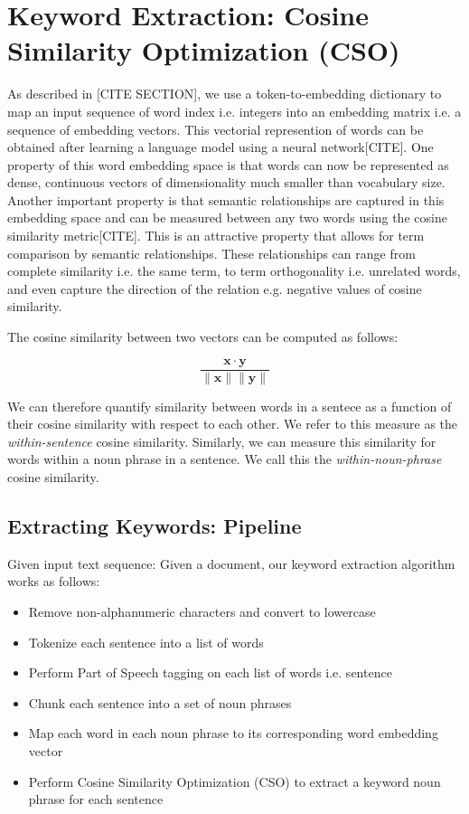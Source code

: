 \section{Keyword Extraction: Cosine Similarity Optimization (CSO)}
As described in [CITE SECTION], we use a token-to-embedding dictionary to map an
input sequence of word index i.e. integers into an embedding matrix i.e. a sequence of
embedding vectors.
This vectorial represention of words can be obtained after learning a language model
using a neural network[CITE]. One property of this word embedding space is that words
can now be represented as dense, continuous vectors of dimensionality much smaller than
vocabulary size. Another important property is that semantic relationships are captured
in this embedding space and can be measured between any two words using the cosine
similarity metric[CITE]. This is an attractive property that allows for term comparison
by semantic relationships. These relationships can range from complete similarity i.e. the
same term, to term orthogonality i.e. unrelated words, and even capture the direction of
the relation e.g. negative values of cosine similarity.

The cosine similarity between two vectors can be computed as follows:

\[
  \frac{\mathbf{x} \cdot \mathbf{y}}{\lVert \mathbf{x} \rVert \lVert \mathbf{y} \rVert}
\]

We can therefore quantify similarity between words in a sentece as a function of their
cosine similarity with respect to each other. We refer to this measure as the \textit{within-sentence}
cosine similarity. Similarly, we can measure this similarity for words within a noun phrase
in a sentence. We call this the \textit{within-noun-phrase} cosine similarity.

\subsection{Extracting Keywords: Pipeline}
Given input text sequence: Given a document, our keyword extraction algorithm works as
follows:
\begin{itemize}
  \item{Remove non-alphanumeric characters and convert to lowercase}
  \item{Tokenize each sentence into a list of words}
  \item{Perform Part of Speech tagging on each list of words i.e. sentence}
  \item{Chunk each sentence into a set of noun phrases}
  \item{Map each word in each noun phrase to its corresponding word embedding vector}
  \item{Perform Cosine Similarity Optimization (CSO) to extract a keyword noun phrase for each sentence}
\end{itemize}

